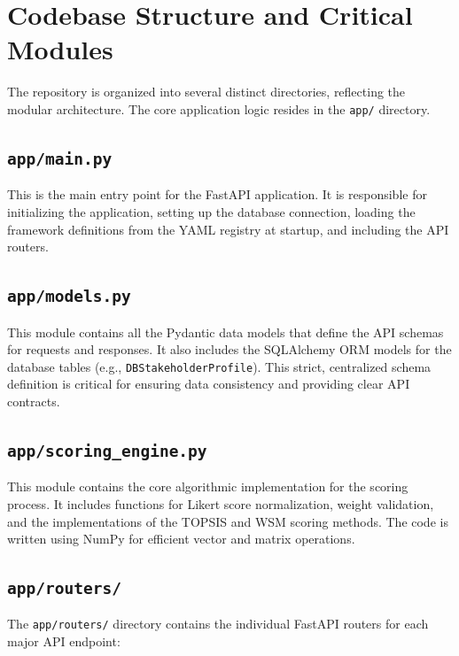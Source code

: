 \section{Codebase Structure and Critical Modules}
\label{sec:codebase}

The repository is organized into several distinct directories, reflecting the modular architecture. The core application logic resides in the \texttt{app/} directory.

\subsection{\texttt{app/main.py}}

This is the main entry point for the FastAPI application. It is responsible for initializing the application, setting up the database connection, loading the framework definitions from the YAML registry at startup, and including the API routers.

\subsection{\texttt{app/models.py}}

This module contains all the Pydantic data models that define the API schemas for requests and responses. It also includes the SQLAlchemy ORM models for the database tables (e.g., \texttt{DBStakeholderProfile}). This strict, centralized schema definition is critical for ensuring data consistency and providing clear API contracts.

\subsection{\texttt{app/scoring\_engine.py}}

This module contains the core algorithmic implementation for the scoring process. It includes functions for Likert score normalization, weight validation, and the implementations of the TOPSIS and WSM scoring methods. The code is written using NumPy for efficient vector and matrix operations.

\subsection{\texttt{app/routers/}}

The \texttt{app/routers/} directory contains the individual FastAPI routers for each major API endpoint:

